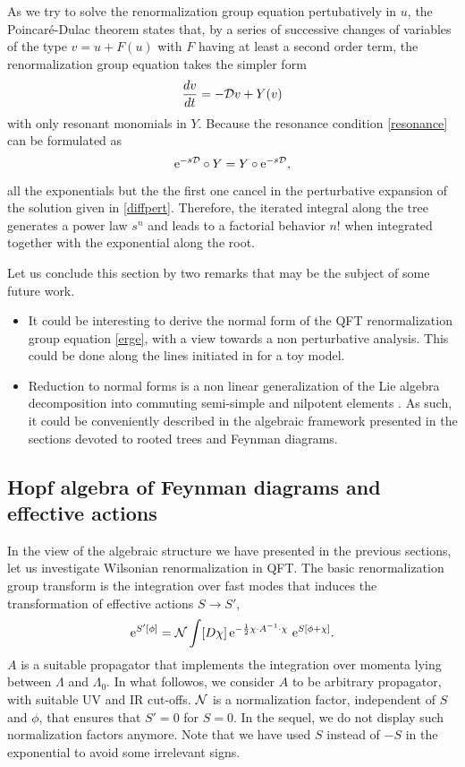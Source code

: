 \documentclass[10pt,here,feynmf]{article}
\begin{document}
As we try to solve the renormalization group equation pertubatively in $u$, the Poincar\'e-Dulac theorem states that, by a series of successive changes of variables of the type $v=u+F(u)$ with $F$ having at least a second order term, the renormalization group equation takes  the simpler form
\begin{equation}
\frac{dv}{dt}=-{\cal D}v+Y(v)\label{non linear}
\end{equation}
with only resonant monomials in $Y$. Because the resonance condition \eqref{resonance} can be formulated as 
\begin{equation}
\mathrm{e}^{-s{\cal D}}\circ Y=Y\circ\mathrm{e}^{-s{\cal D}},
\end{equation}
all the exponentials but the the first one cancel in the perturbative expansion of the solution given in \eqref{diffpert}. Therefore, the iterated integral along the tree generates a power law $s^{n}$ and leads to a factorial behavior $n!$ when integrated together with the exponential along the root.

Let us conclude this section by two remarks that may be the subject of some future work.

\begin{itemize}
\item
It could be interesting to derive the  normal form of the QFT renormalization group equation \eqref{erge}, with a view towards a non perturbative analysis. This could be done along the lines initiated in \cite{lebellac} for a toy model.
\item
Reduction to  normal forms is a non linear generalization of the Lie algebra decomposition into commuting semi-simple and nilpotent elements \cite{arnold}. As such, it could be conveniently described in the algebraic framework presented in the sections devoted to rooted trees and Feynman diagrams.

\end{itemize}

\subsection{Hopf algebra of Feynman diagrams and effective actions}

In the view of the algebraic structure we have presented in the previous sections, let us investigate Wilsonian renormalization in QFT. The basic renormalization group transform is the integration over fast modes that induces the transformation of effective actions $S\rightarrow S'$,
\begin{equation}
\mathrm{e}^{S'[\phi]}={\cal N}
\int[D\chi]\,\mathrm{e}^{-\frac{1}{2}\chi\cdot A^{-1}\cdot \chi}\,
\,\mathrm{e}^{S[\phi+\chi]}.
\end{equation}
$A$ is a suitable propagator that implements the integration over momenta lying between $\Lambda$ and $\Lambda_{0}$. In what followos, we consider $A$ to be arbitrary propagator, with suitable UV and IR cut-offs. ${\cal N}$ is a normalization factor, independent of $S$ and $\phi$, that ensures that $S'=0$ for $S=0$. In the sequel, we do not display such normalization factors anymore. Note that we have used $S$ instead of $-S$ in the exponential to avoid some irrelevant signs.
\end{document}
